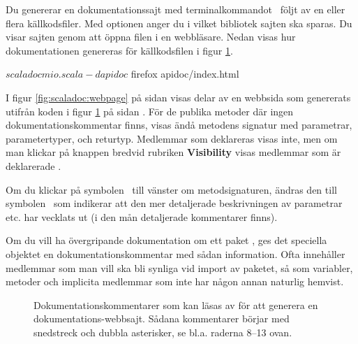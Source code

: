 Du genererar en dokumentationssajt med terminalkommandot \scaladoc~följt av en eller flera källkodsfiler. Med optionen  anger du i vilket bibliotek sajten ska sparas. Du visar sajten genom att öppna filen  i en webbläsare. Nedan visas hur dokumentationen genereras för källkodsfilen i figur \ref{fig:scaladoc:mio}.
\begin{REPLnonum}
$ scaladoc mio.scala -d apidoc
$ firefox apidoc/index.html
\end{REPLnonum}

I figur \ref{fig:scaladoc:webpage} på sidan \pageref{fig:scaladoc:webpage} visas delar av en webbsida som genererats utifrån koden i figur \ref{fig:scaladoc:mio} på sidan \pageref{fig:scaladoc:mio}. För de publika metoder där ingen dokumentationskommentar finns, visas ändå metodens signatur med parametrar, parametertyper, och returtyp. Medlemmar som deklareras  visas inte, men om man klickar på knappen  bredvid rubriken \textbf{Visibility} visas medlemmar som är deklarerade .

Om du klickar på symbolen \Forward~till vänster om metodsignaturen, ändras den till symbolen \MoveDown  ~som indikerar att den mer detaljerade beskrivningen av parametrar etc. har vecklats ut (i den mån detaljerade kommentarer finns). 

Om du vill ha övergripande dokumentation om ett paket , ges det speciella objektet  en dokumentationskommentar med sådan information. Ofta innehåller  medlemmar som man vill ska bli synliga vid import av paketet, så som variabler, metoder och implicita medlemmar som inte har någon annan naturlig hemvist.

\begin{figure}[b]
    \caption{Dokumentationskommentarer som kan läsas av \scaladoc för att generera en dokumentations-webbsajt. Sådana kommentarer börjar  med snedstreck och dubbla asterisker, se bl.a. raderna 8--13 ovan.}
    \label{fig:scaladoc:mio}
\end{figure}

